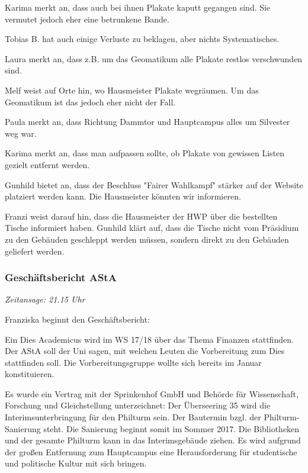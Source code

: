 \documentclass[ngerman,headheight=70pt]{scrartcl}
\begin{document}
    Karima merkt an, dass auch bei ihnen Plakate kaputt gegangen sind. Sie vermutet
    jedoch eher eine betrunkene Bande.

    Tobias B. hat auch einige Verluste zu beklagen, aber nichts Systematisches.

    Laura merkt an, dass z.B. um das Geomatikum alle Plakate restlos verschwunden
    sind.

    Melf weist auf Orte hin, wo Hausmeister Plakate wegräumen. Um das Geomatikum
    ist das jedoch eher nicht der Fall.

    Paula merkt an, dass Richtung Dammtor und Hauptcampus alles um Silvester
    weg war.

    Karima merkt an, dass man aufpassen sollte, ob Plakate von gewissen Listen
    gezielt entfernt werden.

    Gunhild bietet an, dass der Beschluss "Fairer Wahlkampf" stärker auf der
    Website platziert werden kann. Die Hausmeister könnten wir informieren.

    Franzi weist darauf hin, dass die Hausmeister der HWP über die bestellten
    Tische informiert haben. Gunhild klärt auf, dass die Tische nicht vom
    Präsidium zu den Gebäuden geschleppt werden müssen, sondern direkt zu den
    Gebäuden geliefert werden.

    \subsubsection{Geschäftsbericht AStA}

    \textit{Zeitansage: 21.15 Uhr}

    Franziska beginnt den Geschäftsbericht:

    Ein Dies Academicus wird im WS 17/18 über das Thema Finanzen stattfinden.
    Der AStA soll der Uni sagen, mit welchen Leuten die Vorbereitung zum Dies
    stattfinden soll. Die Vorbereitungsgruppe wollte sich bereits im Januar
    konstituieren.

    Es wurde ein Vertrag mit der Sprinkenhof GmbH und Behörde für Wissenschaft,
    Forschung und Gleichstellung unterzeichnet:
    Der Überseering 35 wird die Interimsunterbringung für den Philturm sein.
    Der Bautermin bzgl. der Philturm-Sanierung steht. Die Sanierung beginnt somit
    im Sommer 2017. Die Bibliotheken und der gesamte Philturm kann in das
    Interimsgebäude ziehen. Es wird aufgrund der großen Entfernung zum Hauptcampus
    eine Herausforderung für studentische und politische Kultur mit sich bringen.
\end{document}
